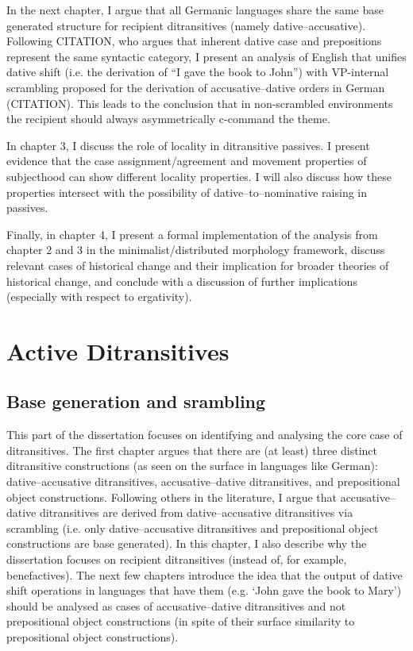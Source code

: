 \documentclass[11pt]{upenndiss}
\begin{document}
In the next chapter, I argue that all Germanic languages share the same base generated structure for recipient ditransitives (namely dative--accusative). Following CITATION, who argues that inherent dative case and prepositions represent the same syntactic category, I present an analysis of English that unifies dative shift (i.e. the derivation of ``I gave the book to John'') with VP-internal scrambling proposed for the derivation of accusative--dative orders in German (CITATION). This leads to the conclusion that in non-scrambled environments the recipient should always asymmetrically c-command the theme.

In chapter 3, I discuss the role of locality in ditransitive passives. I present evidence that the case assignment/agreement and movement properties of subjecthood can show different locality properties. I will also discuss how these properties intersect with the possibility of dative--to--nominative raising in passives.

Finally, in chapter 4, I present a formal implementation of the analysis from chapter 2 and 3 in the minimalist/distributed morphology framework, discuss relevant cases of historical change and their implication for broader theories of historical change, and conclude with a discussion of further implications (especially with respect to ergativity).

\part{Active Ditransitives}
\chapter{Base generation and srambling}\label{ch:base-gen}
This part of the dissertation focuses on identifying and analysing the core case of ditransitives. The first chapter argues that there are (at least) three distinct ditransitive constructions (as seen on the surface in languages like German): dative--accusative ditransitives, accusative--dative ditransitives, and prepositional object constructions. Following others in the literature, I argue that accusative--dative ditransitives are derived from dative--accusative ditransitives via scrambling (i.e. only dative--accusative ditransitives and prepositional object constructions are base generated). In this chapter, I also describe why the dissertation focuses on recipient ditransitives (instead of, for example, benefactives). The next few chapters introduce the idea that the output of dative shift operations in languages that have them (e.g. `John gave the book to Mary') should be analysed as cases of accusative--dative ditransitives and not prepositional object constructions (in spite of their surface similarity to prepositional object constructions). 
\end{document}
